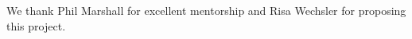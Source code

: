 % 
We thank Phil Marshall for excellent mentorship and Risa Wechsler for proposing this project.
% 
